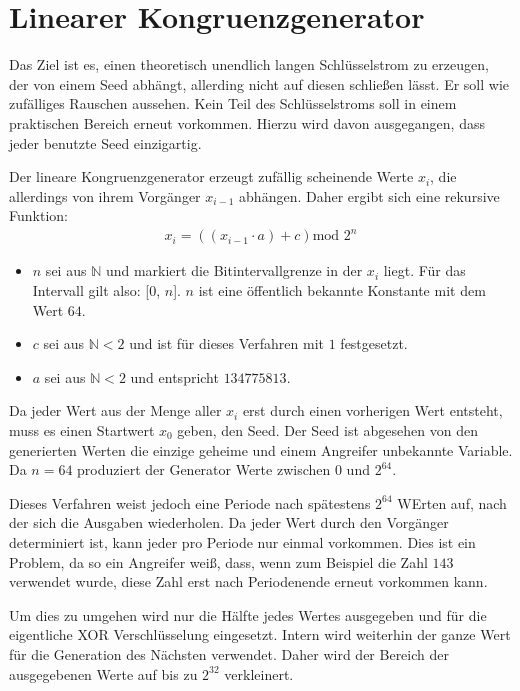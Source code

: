 \documentclass[10pt,a4paper]{article}
\begin{document}
\section{Linearer Kongruenzgenerator}

Das Ziel ist es, einen theoretisch unendlich langen Schlüsselstrom zu erzeugen, der von einem Seed abhängt, allerding nicht auf diesen schließen lässt.
Er soll wie zufälliges Rauschen aussehen.
Kein Teil des Schlüsselstroms soll in einem praktischen Bereich erneut vorkommen.
Hierzu wird davon ausgegangen, dass jeder benutzte Seed einzigartig.

\medskip
Der lineare Kongruenzgenerator erzeugt zufällig scheinende Werte $x_i$, die allerdings von ihrem Vorgänger $x_{i-1}$ abhängen.
Daher ergibt sich eine rekursive Funktion:
\begin{align*}
    x_i = \left(\left(x_{i-1} \cdot a\right) + c\right) \text{mod } 2^n
\end{align*}
\begin{itemize}
    \item $n$ sei aus $\mathbb{N}$ und markiert die Bitintervallgrenze in der $x_i$ liegt.
          Für das Intervall gilt also: [0, $n$].
          $n$ ist eine öffentlich bekannte Konstante mit dem Wert $64$.
    \item $c$ sei aus $\mathbb{N}<2$ und ist für dieses Verfahren mit $1$ festgesetzt.
    \item $a$ sei aus $\mathbb{N}<2$ und entspricht $134775813$.
\end{itemize}
Da jeder Wert aus der Menge aller $x_i$ erst durch einen vorherigen Wert entsteht, muss es einen Startwert $x_0$ geben, den Seed.
Der Seed ist abgesehen von den generierten Werten die einzige geheime und einem Angreifer unbekannte Variable.
Da $n = 64$ produziert der Generator Werte zwischen $0$ und $2^{64}$.

\medskip
Dieses Verfahren weist jedoch eine Periode nach spätestens $2^{64}$ WErten auf, nach der sich die Ausgaben wiederholen.
Da jeder Wert durch den Vorgänger determiniert ist, kann jeder pro Periode nur einmal vorkommen.
Dies ist ein Problem, da so ein Angreifer weiß, dass, wenn zum Beispiel die Zahl $143$ verwendet wurde, diese Zahl erst nach Periodenende erneut vorkommen kann.

Um dies zu umgehen wird nur die Hälfte jedes Wertes ausgegeben und für die eigentliche XOR Verschlüsselung eingesetzt.
Intern wird weiterhin der ganze Wert für die Generation des Nächsten verwendet.
Daher wird der Bereich der ausgegebenen Werte auf bis zu $2^{32}$ verkleinert.
\end{document}
